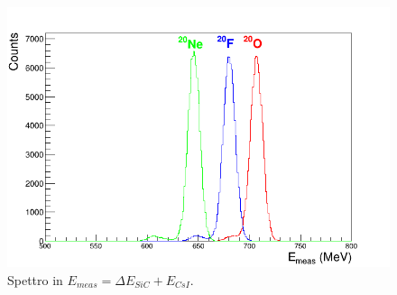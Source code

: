 \begin{figure} [!p]
	\centering
	\includegraphics[scale=0.5]{Grafici_Tesi2/Particelle_monocromatiche/ETot.png}
	\caption{Spettro in $E_{meas} = \Delta E_{SiC} + E_{CsI}$.} \label{fig:ETot}
\end{figure}








\subsection{} \label{par:particelle_non_monocromatiche}







